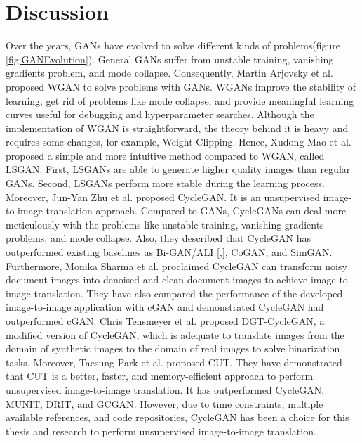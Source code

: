 \section{Discussion}\label{rwdiscussion}
Over the years, \acp{GAN} have evolved to solve different kinds of problems(figure \ref{fig:GANEvolution}). General \acp{GAN} suffer from unstable training, vanishing gradients problem, and mode collapse. Consequently, Martin Arjovsky et al.\cite{arjovsky2017wasserstein} proposed \ac{WGAN} to solve problems with \acp{GAN}. \acp{WGAN} improve the stability of learning, get rid of problems like mode collapse, and provide meaningful learning curves useful for debugging and hyperparameter searches. Although the implementation of \ac{WGAN} is straightforward, the theory behind it is heavy and requires some changes, for example, Weight Clipping\cite{gulrajani2017improved}. Hence, Xudong Mao et al.\cite{mao2017squares} proposed a simple and more intuitive method compared to \ac{WGAN}, called \ac{LSGAN}. First, \acp{LSGAN} are able to generate higher quality images than regular \acp{GAN}\cite{mao2017squares}. Second, \acp{LSGAN} perform more stable during the learning process\cite{mao2017squares}. Moreover, Jun-Yan Zhu et al.\cite{zhu2020unpaired} proposed \ac{CycleGAN}. It is an unsupervised image-to-image translation approach. Compared to \acp{GAN}, \acp{CycleGAN} can deal more meticulously with the problems like unstable training, vanishing gradients problems, and mode collapse. Also, they described that \ac{CycleGAN} has outperformed existing baselines as Bi-GAN/ALI [\cite{donahue2017adversarial},\cite{dumoulin2017adversarially}], CoGAN\cite{liu2016coupled}, and SimGAN\cite{shrivastava2017learning}. Furthermore, Monika Sharma et al.\cite{sharma2019learning} proclaimed  \ac{CycleGAN} can transform noisy document images into denoised and clean document images to achieve image-to-image translation. They have also compared the performance of the developed image-to-image application with \ac{cGAN} and demonstrated \ac{CycleGAN} had outperformed \ac{cGAN}. Chris Tensmeyer et al.\cite{8978087} proposed DGT-CycleGAN, a modified version of \ac{CycleGAN}, which is adequate to translate images from the domain of synthetic images to the domain of real images to solve binarization tasks. Moreover, Taesung Park et al.\cite{park2020contrastive} proposed \ac{CUT}. They have demonstrated that \ac{CUT} is a better, faster, and memory-efficient approach to perform unsupervised image-to-image translation. It has outperformed \ac{CycleGAN}\cite{zhu2020unpaired}, \ac{MUNIT}\cite{liu2018unsupervised}, \ac{DRIT}\cite{lee2019drit}, and \ac{GCGAN}\cite{fu2018geometryconsistent}. However, due to time constraints, multiple available references, and code repositories, \ac{CycleGAN} has been a choice for this thesis and research to perform unsupervised image-to-image translation. 

